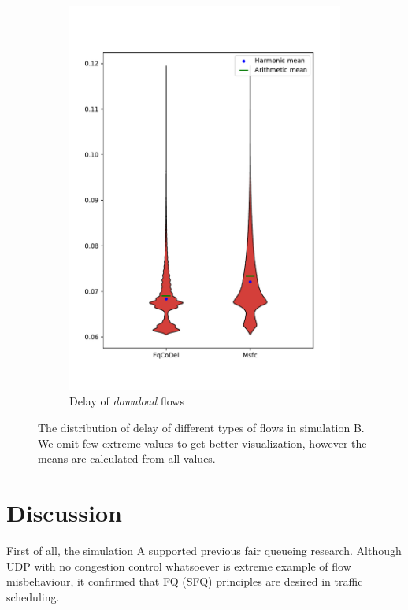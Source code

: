 \begin{figure}
\begin{subfigure}[b]{0.475\textwidth}
		\includegraphics[width=\textwidth]{drawings/type5-delay-down_B}
		\caption[]%
		{{\small Delay of \emph{download} flows}}    
		\label{fig:delay_download_B}
	\end{subfigure}
	\caption[]
	{\small The distribution of delay of different types of flows in simulation B. We omit few extreme values to get better visualization, however the means are calculated from all values.} 
	\label{fig:delay_flows_B}
\end{figure}



\section{Discussion}

First of all, the simulation A supported previous fair queueing research. Although UDP with no congestion control whatsoever is extreme example of flow misbehaviour, it confirmed that FQ (SFQ) principles are desired in traffic scheduling.

